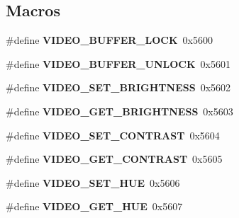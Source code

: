 \subsection*{Macros}
\begin{DoxyCompactItemize}
\item 
\mbox{\label{group__lm32__milkymist__video_ga8535307713936c41a6bad97711e2321a}} 
\#define {\bfseries V\+I\+D\+E\+O\+\_\+\+B\+U\+F\+F\+E\+R\+\_\+\+L\+O\+CK}~0x5600
\item 
\mbox{\label{group__lm32__milkymist__video_gaa3244f7add20e903b82c0cdbbe172a40}} 
\#define {\bfseries V\+I\+D\+E\+O\+\_\+\+B\+U\+F\+F\+E\+R\+\_\+\+U\+N\+L\+O\+CK}~0x5601
\item 
\mbox{\label{group__lm32__milkymist__video_ga40b8ac7181c91e51fe45a85b1dfb23ab}} 
\#define {\bfseries V\+I\+D\+E\+O\+\_\+\+S\+E\+T\+\_\+\+B\+R\+I\+G\+H\+T\+N\+E\+SS}~0x5602
\item 
\mbox{\label{group__lm32__milkymist__video_ga8294f6aa3908ee9324b3b0c418e8b565}} 
\#define {\bfseries V\+I\+D\+E\+O\+\_\+\+G\+E\+T\+\_\+\+B\+R\+I\+G\+H\+T\+N\+E\+SS}~0x5603
\item 
\mbox{\label{group__lm32__milkymist__video_ga782b19197e7ea592487a57a971467bd3}} 
\#define {\bfseries V\+I\+D\+E\+O\+\_\+\+S\+E\+T\+\_\+\+C\+O\+N\+T\+R\+A\+ST}~0x5604
\item 
\mbox{\label{group__lm32__milkymist__video_gae804f472117605315b181cd560aabe06}} 
\#define {\bfseries V\+I\+D\+E\+O\+\_\+\+G\+E\+T\+\_\+\+C\+O\+N\+T\+R\+A\+ST}~0x5605
\item 
\mbox{\label{group__lm32__milkymist__video_gafbee74a879c0e17008500800d4ac89a8}} 
\#define {\bfseries V\+I\+D\+E\+O\+\_\+\+S\+E\+T\+\_\+\+H\+UE}~0x5606
\item 
\mbox{\label{group__lm32__milkymist__video_ga136b93b8ecc78c90b1ebb25fb41234d6}} 
\#define {\bfseries V\+I\+D\+E\+O\+\_\+\+G\+E\+T\+\_\+\+H\+UE}~0x5607
\item 

\end{DoxyCompactItemize}
